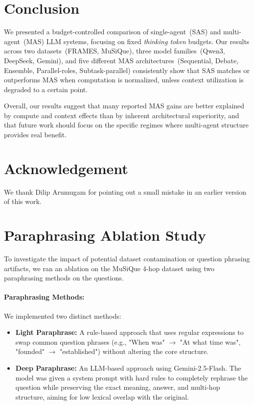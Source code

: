 \documentclass{article} %
\begin{document}
\section{Conclusion}
We presented a budget-controlled comparison of single-agent~(SAS) and multi-agent~(MAS) LLM systems, focusing on fixed \emph{thinking token} budgets. Our results across two datasets~(FRAMES, MuSiQue), three model families~(Qwen3, DeepSeek, Gemini), and five different MAS architectures~(Sequential, Debate, Ensemble, Parallel-roles, Subtask-parallel) consistently show that SAS matches or outperforms MAS when computation is normalized, unless context utilization is degraded to a certain point. 

Overall, our results suggest that many reported MAS gains are better explained by compute and context effects than by inherent architectural superiority, and that future work should focus on the specific regimes where multi-agent structure provides real benefit.

\section{Acknowledgement}
We thank Dilip Arumugam for pointing out a small mistake in an earlier version of this work.




\appendix

\section{Paraphrasing Ablation Study}
\label{appendix:paraphrase}
To investigate the impact of potential dataset contamination or question phrasing artifacts, we ran an ablation on the MuSiQue 4-hop dataset using two paraphrasing methods on the questions.

\paragraph{Paraphrasing Methods:}
We implemented two distinct methods:
\begin{itemize}
    \item \textbf{Light Paraphrase:} A rule-based approach that uses regular expressions to swap common question phrases (e.g., "When was" $\to$ "At what time was", "founded" $\to$ "established") without altering the core structure.
    \item \textbf{Deep Paraphrase:} An LLM-based approach using Gemini-2.5-Flash. The model was given a system prompt with hard rules to completely rephrase the question while preserving the exact meaning, answer, and multi-hop structure, aiming for low lexical overlap with the original.
\end{itemize}
\end{document}
